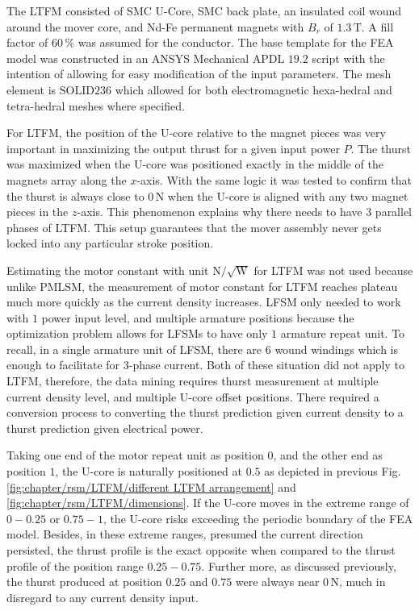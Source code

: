             
            The \acs{LTFM} consisted of \acs{SMC} U-Core, \acs{SMC} back plate, an insulated coil wound around the mover core, and Nd-Fe permanent magnets with $B_r$ of $1.3\,\mathrm{T}$. A fill factor of $60\,\%$ was assumed for the conductor.  The base template for the \acs{FEA} model was constructed in an ANSYS Mechanical APDL $19.2$ script with the intention of allowing for easy modification of the input parameters. The mesh element is $\mathrm{SOLID236}$ which allowed for both electromagnetic hexa-hedral and tetra-hedral meshes where specified.
  
            
            For \acs{LTFM}, the position of the U-core relative to the magnet pieces was very important in maximizing the output thrust for a given input power $P$. The thurst was maximized when the U-core was positioned exactly in the middle of the magnets array along the $x$-axis. With the same logic it was tested to confirm that the thurst is always close to $0\,\mathrm{N}$ when the U-core is aligned with any two magnet pieces in the $z$-axis. This phenomenon explains why there needs to have $3$ parallel phases of \acs{LTFM}. This setup guarantees that the mover assembly never gets locked into any particular stroke position.
            
            
            Estimating the motor constant with unit $\mathrm{N/\sqrt{W}}$ for \acs{LTFM} was not used because unlike \acs{PMLSM}, the measurement of motor constant for \acs{LTFM} reaches plateau much more quickly as the current density increases. \acs{LFSM} only needed to work with $1$ power input level, and multiple armature positions because the optimization problem allows for \acsp{LFSM} to have only $1$ armature repeat unit. To recall, in a single armature unit of \acs{LFSM}, there are $6$ wound windings which is enough to facilitate for 3-phase current. Both of these situation did not apply to \acs{LTFM}, therefore, the data mining requires thurst measurement at multiple current density level, and multiple U-core offset positions. There required a conversion process to converting the thurst prediction given current density to a thurst prediction given electrical power.
            
            Taking one end of the motor repeat unit as position $0$, and the other end as position $1$, the U-core is naturally positioned at $0.5$ as depicted in previous Fig.\,\ref{fig:chapter/rsm/LTFM/different LTFM arrangement} and \ref{fig:chapter/rsm/LTFM/dimensions}. If the U-core moves in the extreme range of $0-0.25$ or $0.75-1$, the U-core risks exceeding the periodic boundary of the \acs{FEA} model. Besides, in these extreme ranges, presumed the current direction persisted, the thrust profile is the exact opposite when compared to the thrust profile of the position range $0.25-0.75$. Further more, as discussed previously, the thurst produced at position $0.25$ and $0.75$ were always near $0\,\mathrm{N}$, much in disregard to any current density input. 
            
